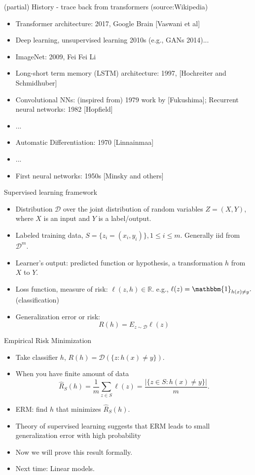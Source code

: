\documentclass[final]{beamer}
\begin{document}
\begin{frame}{(partial) History - trace back from transformers (source:Wikipedia)}
	\begin{itemize}
		\item Transformer architecture: 2017, Google Brain [Vaswani et al]
		\item Deep learning, unsupervised learning 2010s (e.g., GANs 2014)...
		\item ImageNet: 2009, Fei Fei Li 
		\item Long-short term memory (LSTM) architecture: 1997, [Hochreiter and Schmidhuber]
		\item Convolutional NNs: (inspired from) 1979 work by [Fukushima];  Recurrent neural networks: 1982 [Hopfield]
		\item ...
		\item Automatic Differentiation: 1970 [Linnainmaa]
		\item ...
		\item First neural networks: 1950s [Minsky and others]
	\end{itemize}
\end{frame}
\begin{frame}{Supervised learning framework}
	\begin{itemize}
		\item Distribution $\mathcal{D}$ over the joint distribution of random variables $Z = (X, Y)$, where $X$ is an input and $Y$ is a label/output.
		\pause
	\item Labeled training data, $S = \{z_i = (x_i, y_i)\}, 1\leq i \leq m.$ Generally iid from $\mathcal{D}^m.$
		\pause
		\item Learner's output: predicted function or hypothesis, a transformation $h$ from $X$ to $Y$.
		\pause
	\item Loss function, measure of risk:  $\ell(z, h) \in \mathbb{R}$. e.g., $\ell(z) =  \mathbbm{1}_{h(x) \neq y}.$ (classification)
	\pause
	\item Generalization error or risk: 
		$$R(h) = E_{z\sim \mathcal{D}} \ell(z)$$
	\end{itemize}
\end{frame}
\begin{frame}{Empirical Risk Minimization}
	\begin{itemize}
		\item Take classifier $h$, $R(h) = \mathcal{D}(\{z: h(x) \neq y\}).$
		\pause
		\item When you have finite amount of data
		$$ \hat{R}_S(h) = \dfrac{1}{m} \sum_{z \in S} \ell(z) = \dfrac{|\{z \in S: h(x) \neq y\}|}{m}.$$
		\pause
	\item ERM: find $h$ that minimizes $\hat{R}_S(h).$
	\pause
	\item Theory of supervised learning suggests that ERM leads to small generalization error with high probability
	\pause
	\item Now we will prove this result formally. 
	\pause
\item Next time: Linear models.
\end{itemize}
\end{frame}
\end{document}
